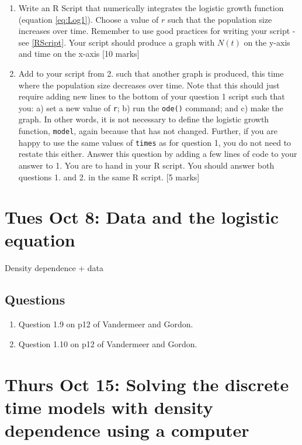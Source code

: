 \documentclass[]{book}
\providecommand{\tightlist}{%
  \setlength{\itemsep}{0pt}\setlength{\parskip}{0pt}}
\begin{document}
\begin{enumerate}
\def\labelenumi{\arabic{enumi}.}
\item
  Write an R Script that numerically integrates the logistic growth
  function (equation \eqref{eq:Log1}). Choose a value of \(r\) such that
  the population size increases over time. Remember to use good
  practices for writing your script - see \ref{RScript}. Your script
  should produce a graph with \(N(t)\) on the y-axis and time on the
  x-axis {[}10 marks{]}
\item
  Add to your script from 2. such that another graph is produced, this
  time where the population size decreases over time. Note that this
  should just require adding new lines to the bottom of your question 1
  script such that you: a) set a new value of \texttt{r}; b) run the
  \texttt{ode()} command; and c) make the graph. In other words, it is
  not necessary to define the logistic growth function, \texttt{model},
  again because that has not changed. Further, if you are happy to use
  the same values of \texttt{times} as for question 1, you do not need
  to restate this either. Answer this question by adding a few lines of
  code to your answer to 1. You are to hand in your R script. You should
  answer both questions 1. and 2. in the same R script. {[}5 marks{]}
\end{enumerate}

\chapter{Tues Oct 8: Data and the logistic
equation}\label{tues-oct-8-data-and-the-logistic-equation}

Density dependence + data

\section{Questions}\label{questions-11}

\begin{enumerate}
\def\labelenumi{\arabic{enumi}.}
\tightlist
\item
  Question 1.9 on p12 of Vandermeer and Gordon.
\item
  Question 1.10 on p12 of Vandermeer and Gordon.
\end{enumerate}

\chapter{Thurs Oct 15: Solving the discrete time models with density
dependence using a
computer}\label{thurs-oct-15-solving-the-discrete-time-models-with-density-dependence-using-a-computer}
\end{document}

